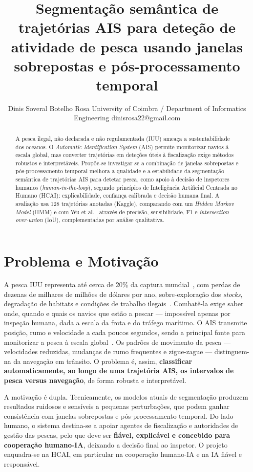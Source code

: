 \documentclass{article}
\title{Segmenta\c{c}\~ao sem\^antica de trajet\'orias AIS para dete\c{c}\~ao de atividade de pesca usando janelas sobrepostas e p\'os-processamento temporal}
\author{
    Dinis Soveral Botelho Rosa
    \affiliations
    University of Coimbra / Department of Informatics Engineering
    \emails
    dinisrosa22@gmail.com
}
\begin{document}
\maketitle

\begin{abstract}
A pesca ilegal, não declarada e não regulamentada (IUU) ameaça a sustentabilidade dos oceanos. O \emph{Automatic Identification System} (AIS) permite monitorizar navios à escala global, mas converter trajetórias em deteções úteis à fiscalização exige métodos robustos e interpretáveis. Propõe-se investigar se a combinação de janelas sobrepostas e pós-processamento temporal melhora a qualidade e a estabilidade da segmentação semântica de trajetórias AIS para detetar pesca, como apoio à decisão de inspetores humanos (\emph{human-in-the-loop}), segundo princípios de Inteligência Artificial Centrada no Humano (HCAI): explicabilidade, confiança calibrada e decisão humana final. A avaliação usa 128 trajetórias anotadas (Kaggle), comparando com um \emph{Hidden Markov Model} (HMM) e com Wu et al.~ através de precisão, sensibilidade, F1 e \emph{intersection-over-union} (IoU), complementadas por análise qualitativa.
\end{abstract}

\section{Problema e Motivação}
\label{sec:problema-motivacao}

A pesca IUU representa até cerca de 20\% da captura mundial~\cite{agnew2009}, com perdas de dezenas de milhares de milhões de dólares por ano, sobre-exploração dos \emph{stocks}, degradação de habitats e condições de trabalho ilegais~\cite{chuaysi2020}. Combatê-la exige saber onde, quando e quais os navios que estão a pescar --- impossível apenas por inspeção humana, dada a escala da frota e do tráfego marítimo. O AIS transmite posição, rumo e velocidade a cada poucos segundos, sendo a principal fonte para monitorizar a pesca à escala global~\cite{natale2015,kroodsma2018}. Os padrões de movimento da pesca --- velocidades reduzidas, mudanças de rumo frequentes e zigue-zague --- distinguem-na da navegação em trânsito. O problema é, assim, \textbf{classificar automaticamente, ao longo de uma trajetória AIS, os intervalos de pesca versus navegação}, de forma robusta e interpretável.

A motivação é dupla. Tecnicamente, os modelos atuais de segmentação produzem resultados ruidosos e sensíveis a pequenas perturbações, que podem ganhar consistência com janelas sobrepostas e pós-processamento temporal. Do lado humano, o sistema destina-se a apoiar agentes de fiscalização e autoridades de gestão das pescas, pelo que deve ser \textbf{fiável, explicável e concebido para cooperação humano-IA}, deixando a decisão final ao inspetor. O projeto enquadra-se na HCAI, em particular na cooperação humano-IA e na IA fiável e responsável.
\end{document}
